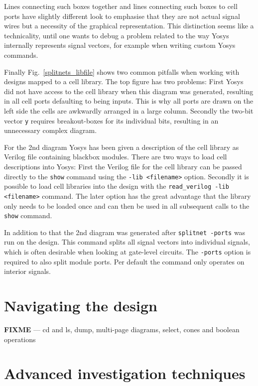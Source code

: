 \documentclass[9pt,technote,a4paper]{IEEEtran}
\def\FIXME{{\color{red}\bf FIXME}}
\begin{document}
Lines connecting such boxes together and lines connecting such boxes to cell
ports have slightly different look to emphasise that they are not actual signal
wires but a necessity of the graphical representation. This distinction seems
like a technicality, until one wants to debug a problem related to the way
Yosys internally represents signal vectors, for example when writing custom
Yosys commands.

\medskip

Finally Fig.~\ref{splitnets_libfile} shows two common pitfalls when working
with designs mapped to a cell library. The top figure has two problems: First
Yosys did not have access to the cell library when this diagram was generated,
resulting in all cell ports defaulting to being inputs. This is why all ports
are drawn on the left side the cells are awkwardly arranged in a large column.
Secondly the two-bit vector {\tt y} requires breakout-boxes for its individual
bits, resulting in an unnecessary complex diagram.

For the 2nd diagram Yosys has been given a description of the cell library as
Verilog file containing blackbox modules. There are two ways to load cell
descriptions into Yosys: First the Verilog file for the cell library can be
passed directly to the {\tt show} command using the {\tt -lib <filename>}
option. Secondly it is possible to load cell libraries into the design with
the {\tt read\_verilog -lib <filename>} command. The later option has the great 
advantage that the library only needs to be loaded once and can then be used
in all subsequent calls to the {\tt show} command.

In addition to that the 2nd diagram was generated after {\tt splitnet -ports}
was run on the design. This command splits all signal vectors into individual
signals, which is often desirable when looking at gate-level circuits. The
{\tt -ports} option is required to also split module ports. Per default the
command only operates on interior signals.


\section{Navigating the design}
\label{navigate}

\FIXME{} --- cd and ls, dump,  multi-page diagrams, select, cones and boolean operations

\section{Advanced investigation techniques}
\label{poke}
\end{document}
